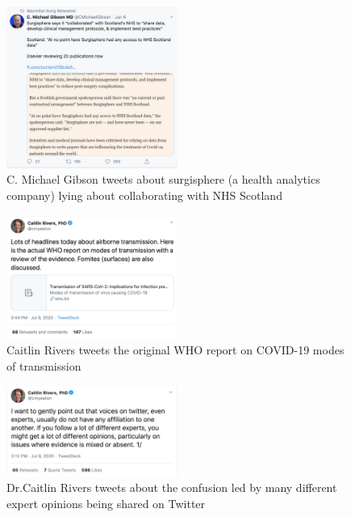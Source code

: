 \documentclass[acmsmall,authordraft]{acmart}
\begin{document}
\begin{figure}
  \includegraphics[width=0.5\textwidth]{Pictures/Appendix_Tweets/c michael gibson tweet.png}
  \caption{C. Michael Gibson tweets about surgisphere (a health analytics company) lying about collaborating with NHS Scotland}
  \label{c_michael_gibson_tweet}
\end{figure}

\begin{figure}
  \includegraphics[width=0.5\textwidth]{Pictures/Appendix_Tweets/caitlin rivers tweet.png}
  \caption{Caitlin Rivers tweets the original WHO report on COVID-19 modes of transmission}
  \label{caitlin_rivers_tweet}
\end{figure}

\begin{figure}
  \includegraphics[width=0.5\textwidth]{Pictures/Appendix_Tweets/caitlin rivers tweet2.png}
  \caption{Dr.Caitlin Rivers tweets about the confusion led by many different expert opinions being shared on Twitter}
  \label{caitlin_rivers_tweet2}
\end{figure}
\end{document}
